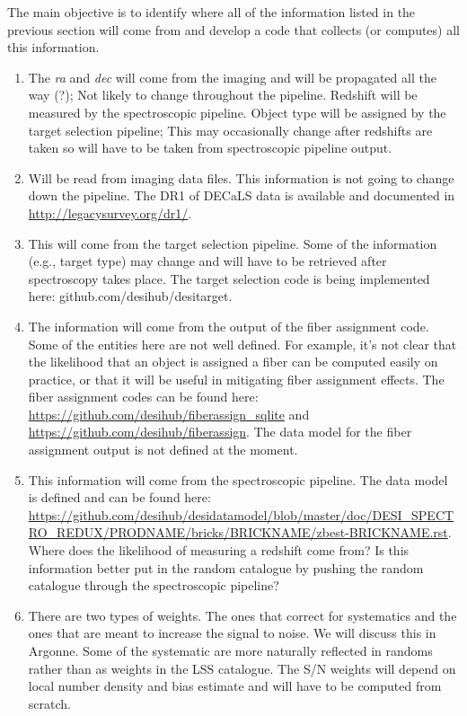 \documentclass[11pt]{article}
\begin{document}
The main objective is to identify where all of the information listed in the
previous section will come from and develop a code that collects (or computes)
all this information.
\begin{enumerate}
\item  The \textit{ra} and \textit{dec} will come from the imaging and will be
propagated all the way (?); Not likely to change throughout the pipeline.
Redshift will be measured by the spectroscopic pipeline. Object type will be
assigned by the target selection pipeline; This may occasionally change after
redshifts are taken so will have to be taken from spectroscopic pipeline output.
\item Will be read from imaging data files. This information is not going to
change down the pipeline. The DR1 of DECaLS data is available and documented in
\url{http://legacysurvey.org/dr1/}.
\item This will come from the target selection pipeline. Some of the information
(e.g., target type) may change and will have to be retrieved after spectroscopy
takes place. The target selection code is being implemented here:
github.com/desihub/desitarget.
\item The information will come from the output of the fiber assignment code.
Some of the entities here are not well defined. For example, it's not clear that
the likelihood that an object is assigned a fiber can be computed easily on
practice, or that it will be useful in mitigating fiber assignment effects. The
fiber assignment codes can be found here:
\url{https://github.com/desihub/fiberassign_sqlite} and
\url{https://github.com/desihub/fiberassign}. The data model for the fiber assignment
output is not defined at the moment.
\item This information will come from the spectroscopic pipeline. The data model
is defined and can be found here:
\url{https://github.com/desihub/desidatamodel/blob/master/doc/DESI_SPECTRO_REDUX/PRODNAME/bricks/BRICKNAME/zbest-BRICKNAME.rst}.
Where does the likelihood of measuring a redshift come from? Is this information
better put in the random catalogue by pushing the random catalogue through the
spectroscopic pipeline?
\item There are two types of weights. The ones that correct for systematics and
the ones that are meant to increase the signal to noise. We will discuss this in
Argonne. Some of the systematic are more naturally reflected in randoms rather
than as weights in the LSS catalogue. The S/N weights will depend on local
number density and bias estimate and will have to be computed from scratch.
\end{enumerate}
\end{document}
